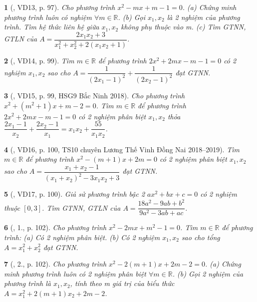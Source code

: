 \documentclass{article}
\newtheorem{baitoan}{}
\begin{document}
\begin{baitoan}[\cite{Thu_Viet_Minh_ptb2}, VD13, p. 97]
	Cho phương trình $x^2 - mx + m - 1 = 0$. (a) Chứng minh phương trình luôn có nghiệm $\forall m\in\mathbb{R}$. (b) Gọi $x_1,x_2$ là 2 nghiệm của phương trình. Tìm hệ thức liên hệ giữa $x_1,x_2$ không phụ thuộc vào m. (c) Tìm {\rm GTNN, GTLN} của $A = \dfrac{2x_1x_2 + 3}{x_1^2 + x_2^2 + 2(x_1x_2 + 1)}$.
\end{baitoan}

\begin{baitoan}[\cite{Thu_Viet_Minh_ptb2}, VD14, p. 99]
	Tìm $m\in\mathbb{R}$ để phương trình $2x^2 + 2mx - m - 1 = 0$ có 2 nghiệm $x_1,x_2$ sao cho $A = \dfrac{1}{(2x_1 - 1)^2} + \dfrac{1}{(2x_2 - 1)^2}$ đạt {\rm GTNN}.
\end{baitoan}

\begin{baitoan}[\cite{Thu_Viet_Minh_ptb2}, VD15, p. 99, HSG9 Bắc Ninh 2018]
	Cho phương trình $x^2 + (m^2 + 1)x + m - 2 = 0$. Tìm $m\in\mathbb{R}$ để phương trình $2x^2 + 2mx - m - 1 = 0$ có 2 nghiệm phân biệt $x_1,x_2$ thỏa $\dfrac{2x_1 - 1}{x_2} + \dfrac{2x_2 - 1}{x_1} = x_1x_2 + \dfrac{55}{x_1x_2}$.
\end{baitoan}

\begin{baitoan}[\cite{Thu_Viet_Minh_ptb2}, VD16, p. 100, TS10 chuyên Lương Thế Vinh Đồng Nai 2018--2019]
	Tìm $m\in\mathbb{R}$ để phương trình $x^2 - (m + 1)x + 2m = 0$ có 2 nghiệm phân biệt $x_1,x_2$ sao cho $A = \dfrac{x_1 + x_2 - 1}{(x_1 + x_2)^2 - 3x_1x_2 + 3}$ đạt {\rm GTNN}.
\end{baitoan}

\begin{baitoan}[\cite{Thu_Viet_Minh_ptb2}, VD17, p. 100]
	Giả sử phương trình bậc 2 $ax^2 + bx + c = 0$ có 2 nghiệm thuộc $[0,3]$. Tìm {\rm GTNN, GTLN} của $A = \dfrac{18a^2 - 9ab + b^2}{9a^2 - 3ab + ac}$.
\end{baitoan}

\begin{baitoan}[\cite{Thu_Viet_Minh_ptb2}, 1., p. 102]
	Cho phương trình $x^2 - 2mx + m^2 - 1 = 0$. Tìm $m\in\mathbb{R}$ để phương trình: (a) Có 2 nghiệm phân biệt. (b) Có 2 nghiệm $x_1,x_2$ sao cho tổng $A = x_1^2 + x_2^2$ đạt {\rm GTNN}. 
\end{baitoan}

\begin{baitoan}[\cite{Thu_Viet_Minh_ptb2}, 2., p. 102]
	Cho phương trình $x^2 - 2(m + 1)x + 2m - 2 = 0$. (a) Chứng minh phương trình luôn có 2 nghiệm phân biệt $\forall m\in\mathbb{R}$. (b) Gọi 2 nghiệm của phương trình là $x_1,x_2$, tính theo m giá trị của biểu thức $A = x_1^2 + 2(m + 1)x_2 + 2m - 2$.
\end{baitoan}
\end{document}
